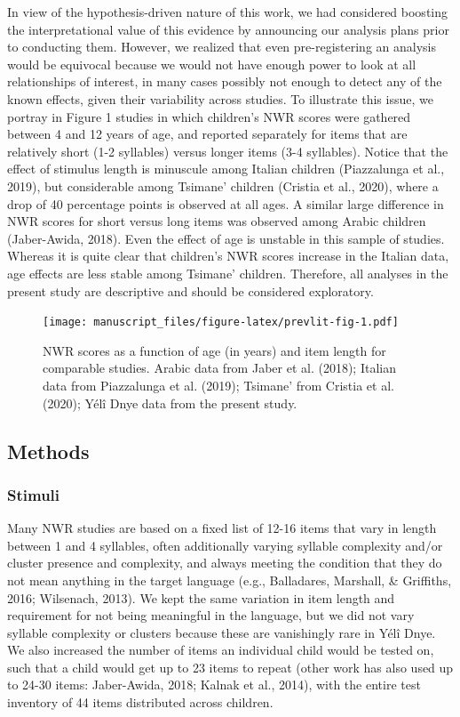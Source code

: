 \documentclass[english,,man,floatsintext]{apa6}
\begin{document}
In view of the hypothesis-driven nature of this work, we had considered
boosting the interpretational value of this evidence by announcing our
analysis plans prior to conducting them. However, we realized that even
pre-registering an analysis would be equivocal because we would not have
enough power to look at all relationships of interest, in many cases
possibly not enough to detect any of the known effects, given their
variability across studies. To illustrate this issue, we portray in
Figure 1 studies in which children's NWR scores were gathered between 4
and 12 years of age, and reported separately for items that are
relatively short (1-2 syllables) versus longer items (3-4 syllables).
Notice that the effect of stimulus length is minuscule among Italian
children (Piazzalunga et al., 2019), but considerable among Tsimane'
children (Cristia et al., 2020), where a drop of 40 percentage points is
observed at all ages. A similar large difference in NWR scores for short
versus long items was observed among Arabic children (Jaber-Awida,
2018). Even the effect of age is unstable in this sample of studies.
Whereas it is quite clear that children's NWR scores increase in the
Italian data, age effects are less stable among Tsimane' children.
Therefore, all analyses in the present study are descriptive and should
be considered exploratory.

\begin{figure}
\centering
\texttt{[image: manuscript\_files/figure-latex/prevlit-fig-1.pdf]}
\caption{\label{fig:prevlit-fig}NWR scores as a function of age (in years)
and item length for comparable studies. Arabic data from Jaber et al.
(2018); Italian data from Piazzalunga et al. (2019); Tsimane' from
Cristia et al. (2020); Yélî Dnye data from the present study.}
\end{figure}

\subsection{Methods}\label{methods}

\subsubsection{Stimuli}\label{stimuli}

Many NWR studies are based on a fixed list of 12-16 items that vary in
length between 1 and 4 syllables, often additionally varying syllable
complexity and/or cluster presence and complexity, and always meeting
the condition that they do not mean anything in the target language
(e.g., Balladares, Marshall, \& Griffiths, 2016; Wilsenach, 2013). We
kept the same variation in item length and requirement for not being
meaningful in the language, but we did not vary syllable complexity or
clusters because these are vanishingly rare in Yélî Dnye. We also
increased the number of items an individual child would be tested on,
such that a child would get up to 23 items to repeat (other work has
also used up to 24-30 items: Jaber-Awida, 2018; Kalnak et al., 2014),
with the entire test inventory of 44 items distributed across children.
\end{document}
